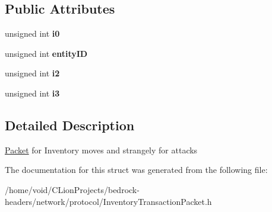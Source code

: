 \subsection*{Public Attributes}
\begin{DoxyCompactItemize}
\item 
\mbox{\label{struct_inventory_transaction_packet_addcbb55dd0151232e84a02228582ce65}} 
unsigned int {\bfseries i0}
\item 
\mbox{\label{struct_inventory_transaction_packet_a68ef79b2f9e8f2bf9b73809b37b93267}} 
unsigned int {\bfseries entity\+ID}
\item 
\mbox{\label{struct_inventory_transaction_packet_a1b783b75eca844f54b5e9bcf8462d162}} 
unsigned int {\bfseries i2}
\item 
\mbox{\label{struct_inventory_transaction_packet_a780552a9e7ca05da776a964f26ce679b}} 
unsigned int {\bfseries i3}
\end{DoxyCompactItemize}


\subsection{Detailed Description}
\mbox{\hyperlink{struct_packet}{Packet}} for Inventory moves and strangely for attacks 

The documentation for this struct was generated from the following file\+:\begin{DoxyCompactItemize}
\item 
/home/void/\+C\+Lion\+Projects/bedrock-\/headers/network/protocol/Inventory\+Transaction\+Packet.\+h\end{DoxyCompactItemize}
